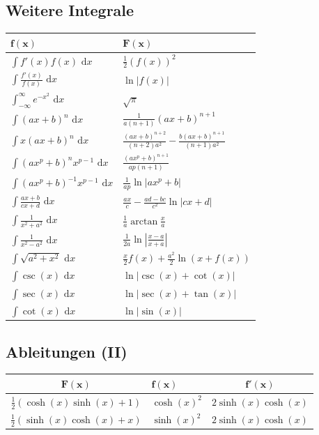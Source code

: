 \documentclass[a4paper,10pt]{article}
\def\dx{\text{ d}x}
\begin{document}
\subsection{Weitere Integrale}
\begin{center}
 \begin{tabularx}{\linewidth}{>{\centering\arraybackslash}X>{\centering\arraybackslash}X}
  \toprule
  $\mathbf{f(x)}$ & $\mathbf{F(x)}$ \\
  \midrule
  $\int f'(x) f(x) \dx$ & $\frac{1}{2}(f(x))^2$ \\
  $\int \frac{f'(x)}{f(x)} \dx$ & $\ln|f(x)|$ \\
  $\int_{-\infty}^\infty e^{-x^2} \dx$ & $\sqrt{\pi}$ \\
  $\int (ax+b)^n \dx$ & $\frac{1}{a(n+1)}(ax+b)^{n+1}$ \\
  $\int x(ax+b)^n \dx$ & $\frac{(ax+b)^{n+2}}{(n+2)a^2} - \frac{b(ax+b)^{n+1}}{(n+1)a^2}$ \\
  $\int (ax^p+b)^n x^{p-1} \dx$ & $\frac{(ax^p+b)^{n+1}}{ap(n+1)}$ \\
  $\int (ax^p + b)^{-1} x^{p-1} \dx$ & $\frac{1}{ap} \ln |ax^p + b|$ \\
  $\int \frac{ax+b}{cx+d} \dx$ & $\frac{ax}{c} - \frac{ad-bc}{c^2} \ln |cx +d|$ \\
  $\int \frac{1}{x^2+a^2} \dx$ & $\frac{1}{a} \arctan \frac{x}{a}$ \\
  $\int \frac{1}{x^2 - a^2} \dx$ & $\frac{1}{2a} \ln\left| \frac{x-a}{x+a} \right|$ \\
  $\int \sqrt{a^2+x^2} \dx $ & $\frac{x}{2}f(x) + \frac{a^2}{2}\ln(x+f(x))$ \\
  $\int \csc(x) \dx $ & $\ln|\csc(x) + \cot(x)|$ \\
  $\int \sec(x) \dx $ & $\ln|\sec(x) + \tan(x)|$ \\
  $\int \cot(x) \dx $ & $\ln|\sin(x)|$ \\
  \bottomrule
 \end{tabularx}
\end{center}

\subsection{Ableitungen (II)}
\begin{center}
  \begin{tabularx}{\linewidth}{c>{\centering\arraybackslash}Xc}
  \toprule
  $\mathbf{F(x)}$ & $\mathbf{f(x)}$ & $\mathbf{f'(x)}$ \\
  \midrule
  $\frac{1}{2}(\cosh(x)\sinh(x)+1)$ & $\cosh(x)^2$ & $2\sinh(x)\cosh(x)$\\
  $\frac{1}{2}(\sinh(x)\cosh(x) + x)$ & $\sinh(x)^2$ & $2\sinh(x)\cosh(x)$\\
  \bottomrule
  \end{tabularx}
\end{center}
\end{document}
